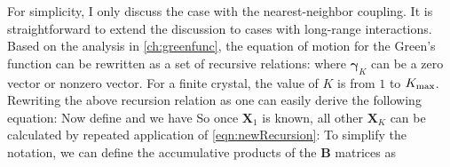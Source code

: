 For simplicity, I only discuss the case with the nearest-neighbor coupling. It is straightforward to extend the discussion to
cases with long-range interactions. Based on the analysis in \autoref{ch:greenfunc}, the equation of motion for the Green's
function can be rewritten as a set of recursive relations:
where $\boldsymbol\gamma_{K}$ can be a zero vector or nonzero vector. For a finite crystal, the value of $K$ is from 
$1$ to  $K_{\rm max}$. Rewriting the above recursion relation as
one can easily derive the following equation:
Now define
and 
we have 
So once $\mathbf{X}_1$ is known, all other $\mathbf{X}_K$ can be calculated by repeated application of 
\autoref{eqn:newRecursion}:
To simplify the notation, we can define the accumulative products of the $\mathbf{B}$ matrices as
